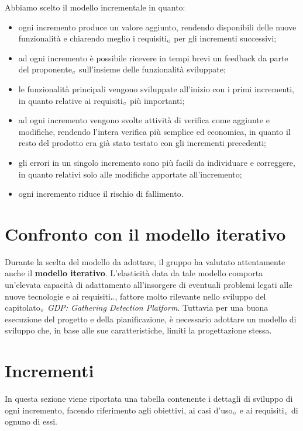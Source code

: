 Abbiamo scelto il modello incrementale in quanto:
\begin{itemize}
	\item ogni incremento produce un valore aggiunto, rendendo disponibili delle nuove funzionalità e chiarendo meglio i requisiti$_{\scaleto{G}{3pt}}$ per gli incrementi successivi;
	\item ad ogni incremento è possibile ricevere in tempi brevi un feedback da parte del proponente$_{\scaleto{G}{3pt}}$ sull'insieme delle funzionalità sviluppate;
	\item le funzionalità principali vengono sviluppate all'inizio con i primi incrementi, in quanto relative ai requisiti$_{\scaleto{G}{3pt}}$ più importanti;
	\item ad ogni incremento vengono svolte attività di verifica come aggiunte e modifiche, rendendo l'intera verifica più semplice ed economica, in quanto il resto del prodotto era già stato testato con gli incrementi precedenti;
	\item gli errori in un singolo incremento sono più facili da individuare e correggere, in quanto relativi solo alle modifiche apportate all'incremento;
	\item ogni incremento riduce il rischio di fallimento.
\end{itemize}

\section{Confronto con il modello iterativo}\label{ModelloDiSviluppoConfrontoConIlModelloIterativo}
Durante la scelta del modello da adottare, il gruppo ha valutato attentamente anche il \textbf{modello iterativo}.
L'elasticità data da tale modello comporta un'elevata capacità di adattamento all'insorgere di eventuali problemi legati alle nuove tecnologie e ai requisiti$_{\scaleto{G}{3pt}}$, fattore molto rilevante nello sviluppo del capitolato$_{\scaleto{G}{3pt}}$ \textit{GDP: Gathering Detection Platform}.
Tuttavia per una buona esecuzione del progetto e della pianificazione, è necessario adottare un modello di sviluppo che, in base alle sue caratteristiche, limiti la progettazione stessa.

\section{Incrementi}\label{ModelloDiSviluppoIncrementi}
In questa sezione viene riportata una tabella contenente i dettagli di sviluppo di ogni incremento, facendo riferimento agli obiettivi, ai casi d'uso$_{\scaleto{G}{3pt}}$ e ai requisiti$_{\scaleto{G}{3pt}}$ di ognuno di essi.

